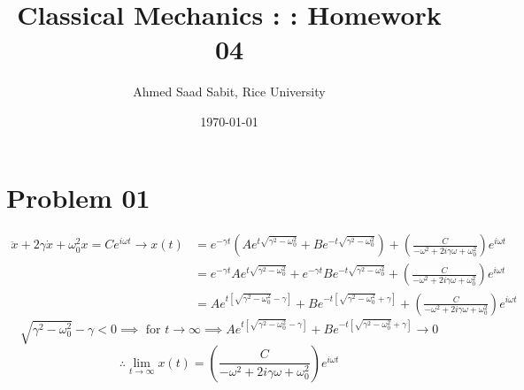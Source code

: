 \documentclass[12pt,letter]{article}
\title{Classical Mechanics : : Homework 04}
\author{Ahmed Saad Sabit, Rice University}
\date{\today}
\begin{document}
\maketitle

\section*{Problem 01} 
\begin{align*}
	\boxed{
\ddot{x}  + 2 \gamma \dot{x} +  \omega_0^2 x = C e^{i \omega t}
}\to  	x(t) &= e^{- \gamma t} 
\left(
A e^{t \sqrt{\gamma^2 - \omega_0^2} } 
+ 
B e^{-t \sqrt{\gamma^2 - \omega_0^2} }
\right) 
+ 
\left(
\frac{C}{- \omega^2 + 2 i \gamma \omega + \omega_0^2} \right)
e^{i \omega t} \\
	 &= e^{- \gamma t} 
A e^{t \sqrt{\gamma^2 - \omega_0^2} } 
+ 
e^{- \gamma t}
B e^{-t \sqrt{\gamma^2 - \omega_0^2} }
+ 
\left(
\frac{C}{- \omega^2 + 2 i \gamma \omega + \omega_0^2} \right)
e^{i \omega t} \\
	 &= 
	 A e^{t [ \sqrt{\gamma^2 - \omega_0^2} - \gamma ] } 
+ 
B e^{-t [\sqrt{\gamma^2 - \omega_0^2}+ \gamma]  }
+ 
\left(
\frac{C}{- \omega^2 + 2 i \gamma \omega + \omega_0^2} \right)
e^{i \omega t} 
\end{align*}
\[
\sqrt{\gamma^2 - \omega_0^2 }  - \gamma < 0  \implies \text{ for } t \to  \infty \implies
	 A e^{t [ \sqrt{\gamma^2 - \omega_0^2} - \gamma ] } 
+ 
B e^{-t [\sqrt{\gamma^2 - \omega_0^2}+ \gamma]  } \to  0
\] 
\begin{equation*}
	\therefore
	\lim_{t \to \infty} x(t) = \left(\frac{C}{- \omega^2 + 2i \gamma \omega + \omega_0^2}\right) e^{i \omega t} \tag{steady state solution}
\end{equation*}
\end{document}
